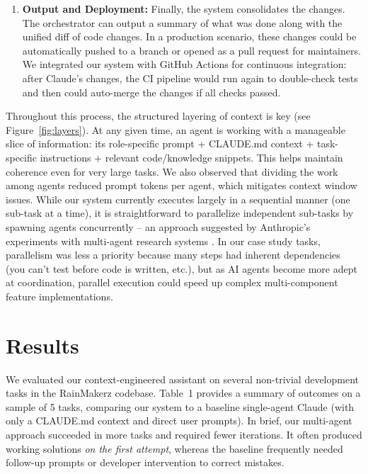 \documentclass[11pt]{article}
\begin{document}
\begin{enumerate}
\item \textbf{Output and Deployment:} Finally, the system consolidates the changes. The orchestrator can output a summary of what was done along with the unified diff of code changes. In a production scenario, these changes could be automatically pushed to a branch or opened as a pull request for maintainers. We integrated our system with GitHub Actions for continuous integration: after Claude's changes, the CI pipeline would run again to double-check tests and then could auto-merge the changes if all checks passed.
\end{enumerate}

Throughout this process, the structured layering of context is key (see Figure~\ref{fig:layers}). At any given time, an agent is working with a manageable slice of information: its role-specific prompt + CLAUDE.md context + task-specific instructions + relevant code/knowledge snippets. This helps maintain coherence even for very large tasks. We also observed that dividing the work among agents reduced prompt tokens per agent, which mitigates context window issues. While our system currently executes largely in a sequential manner (one sub-task at a time), it is straightforward to parallelize independent sub-tasks by spawning agents concurrently – an approach suggested by Anthropic's experiments with multi-agent research systems \cite{anthropic2025}. In our case study tasks, parallelism was less a priority because many steps had inherent dependencies (you can't test before code is written, etc.), but as AI agents become more adept at coordination, parallel execution could speed up complex multi-component feature implementations.

\section{Results}
We evaluated our context-engineered assistant on several non-trivial development tasks in the RainMakerz codebase. Table~1 provides a summary of outcomes on a sample of 5 tasks, comparing our system to a baseline single-agent Claude (with only a CLAUDE.md context and direct user prompts). In brief, our multi-agent approach succeeded in more tasks and required fewer iterations. It often produced working solutions \emph{on the first attempt}, whereas the baseline frequently needed follow-up prompts or developer intervention to correct mistakes.
\end{document}
